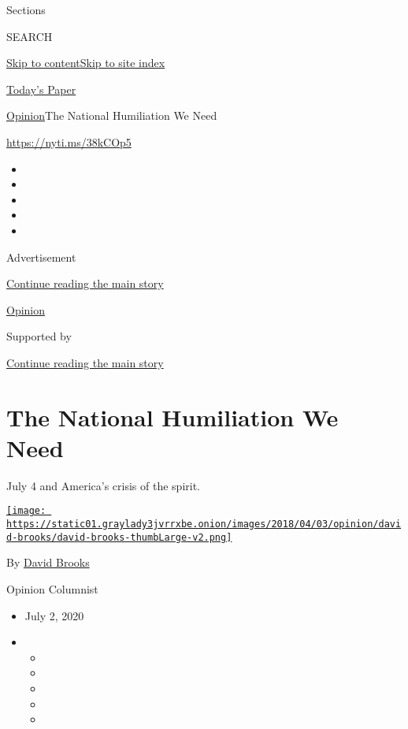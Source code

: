 Sections

SEARCH

\protect\hyperlink{site-content}{Skip to
content}\protect\hyperlink{site-index}{Skip to site index}

\href{https://myaccount.nytimes3xbfgragh.onion/auth/login?response_type=cookie\&client_id=vi}{}

\href{https://www.nytimes3xbfgragh.onion/section/todayspaper}{Today's
Paper}

\href{/section/opinion}{Opinion}\textbar{}The National Humiliation We
Need

\url{https://nyti.ms/38kCOp5}

\begin{itemize}
\item
\item
\item
\item
\item
\end{itemize}

Advertisement

\protect\hyperlink{after-top}{Continue reading the main story}

\href{/section/opinion}{Opinion}

Supported by

\protect\hyperlink{after-sponsor}{Continue reading the main story}

\hypertarget{the-national-humiliation-we-need}{%
\section{The National Humiliation We
Need}\label{the-national-humiliation-we-need}}

July 4 and America's crisis of the spirit.

\href{https://www.nytimes3xbfgragh.onion/by/david-brooks}{\texttt{[image: https://static01.graylady3jvrrxbe.onion/images/2018/04/03/opinion/david-brooks/david-brooks-thumbLarge-v2.png]}}

By \href{https://www.nytimes3xbfgragh.onion/by/david-brooks}{David
Brooks}

Opinion Columnist

\begin{itemize}
\item
  July 2, 2020
\item
  \begin{itemize}
  \item
  \item
  \item
  \item
  \item
  \end{itemize}
\end{itemize}

